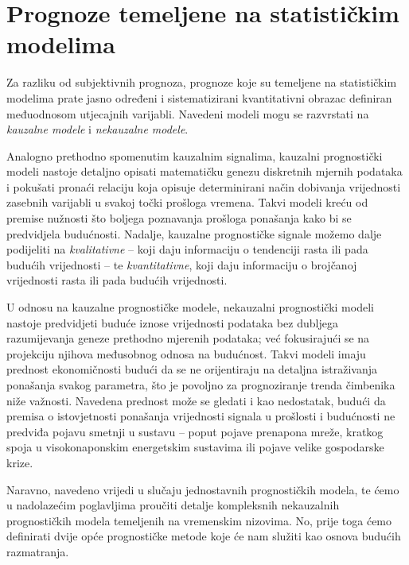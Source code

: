 \documentclass[a4paper,12pt,oneside]{memoir}
\begin{document}
        \section{Prognoze temeljene na statističkim modelima}
            Za razliku od subjektivnih prognoza, prognoze koje su temeljene na statističkim modelima prate jasno određeni i sistematizirani kvantitativni obrazac definiran međuodnosom utjecajnih varijabli. Navedeni modeli mogu se razvrstati na \textit{kauzalne modele} i \textit{nekauzalne modele}.\cite{Holden}
            
            Analogno prethodno spomenutim kauzalnim signalima, kauzalni prognostički modeli nastoje detaljno opisati matematičku genezu diskretnih mjernih podataka i pokušati pronaći relaciju koja opisuje determinirani način dobivanja vrijednosti zasebnih varijabli u svakoj točki prošloga vremena. Takvi modeli kreću od premise nužnosti što boljega poznavanja prošloga ponašanja kako bi se predvidjela budućnosti. Nadalje, kauzalne prognostičke signale možemo dalje podijeliti na \textit{kvalitativne} -- koji daju informaciju o tendenciji rasta ili pada budućih vrijednosti -- te \textit{kvantitativne}, koji daju informaciju o brojčanoj vrijednosti rasta ili pada budućih vrijednosti.
            
            
            U odnosu na kauzalne prognostičke modele, nekauzalni prognostički modeli nastoje predvidjeti buduće iznose vrijednosti podataka bez dubljega razumijevanja geneze prethodno mjerenih podataka; već fokusirajući se na projekciju njihova međusobnog odnosa na budućnost. Takvi modeli imaju prednost ekonomičnosti budući da se ne orijentiraju na detaljna istraživanja ponašanja svakog parametra, što je povoljno za prognoziranje trenda čimbenika niže važnosti. Navedena prednost može se gledati i kao nedostatak, budući da premisa o istovjetnosti ponašanja vrijednosti signala u prošlosti i budućnosti ne predviđa pojavu smetnji u sustavu -- poput pojave prenapona mreže, kratkog spoja u visokonaponskim energetskim sustavima ili pojave velike gospodarske krize. 
            
            
            Naravno, navedeno vrijedi u slučaju jednostavnih prognostičkih modela, te ćemo u nadolazećim poglavljima proučiti detalje kompleksnih nekauzalnih prognostičkih modela temeljenih na vremenskim nizovima. No, prije toga ćemo definirati dvije opće prognostičke metode koje će nam služiti kao osnova budućih razmatranja.
\end{document}
